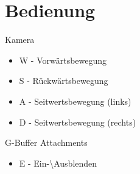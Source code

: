 \chapter{Bedienung}
Kamera
\begin{itemize}
\item W - Vorwärtsbewegung
\item S - Rückwärtsbewegung
\item A - Seitwertsbewegung (links)
\item D - Seitwertsbewegung (rechts)
\end{itemize}

G-Buffer Attachments
\begin{itemize}
\item E - Ein-\textbackslash Ausblenden
\end{itemize}